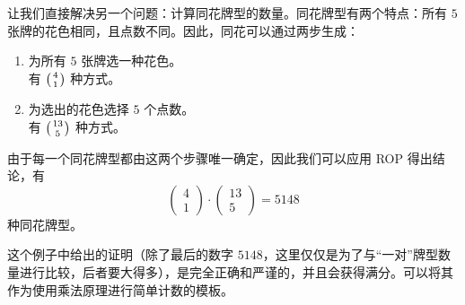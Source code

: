 \begin{example}[同花]

    让我们直接解决另一个问题：计算同花牌型的数量。同花牌型有两个特点：所有 $5$ 张牌的花色相同，且点数不同。因此，同花可以通过两步生成：
    \begin{enumerate}[label=(\arabic*)]
        \item 为所有 $5$ 张牌选一种花色。\\
              有 $\big({4 \atop 1}\big)$ 种方式。
        \item 为选出的花色选择 $5$ 个点数。\\
              有 $\big({13 \atop 5}\big)$ 种方式。
    \end{enumerate}
    由于每一个同花牌型都由这两个步骤唯一确定，因此我们可以应用 ROP 得出结论，有
    \[\begin{pmatrix}
            4 \\
            1
        \end{pmatrix} \cdot \begin{pmatrix}
            13 \\
            5
        \end{pmatrix}=5148\]
    种同花牌型。

    这个例子中给出的证明（除了最后的数字 $5148$，这里仅仅是为了与``一对''牌型数量进行比较，后者要大得多），是完全正确和严谨的，并且会获得满分。可以将其作为使用乘法原理进行简单计数的模板。
\end{example}

